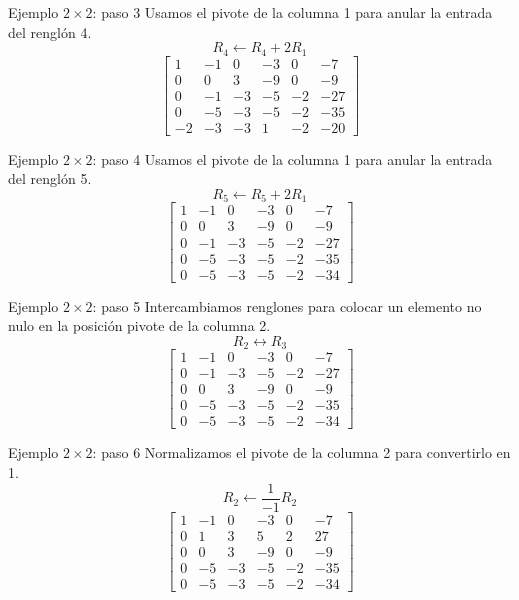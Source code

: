 \documentclass[aspectratio=169,9pt]{beamer}
\theoremstyle{remark}
\begin{document}
\begin{frame}[t]{Ejemplo $2\times2$: paso 3}
Usamos el pivote de la columna 1 para anular la entrada del renglón 4.
\[
R_{4}\leftarrow R_{4}+2R_{1}
\]
\[
\left[\begin{array}{ccccc|c}
1 & -1 & 0 & -3 & 0 & -7\\
0 & 0 & 3 & -9 & 0 & -9\\
0 & -1 & -3 & -5 & -2 & -27\\
0 & -5 & -3 & -5 & -2 & -35\\
-2 & -3 & -3 & 1 & -2 & -20
\end{array}\right]
\]
\end{frame}
\begin{frame}[t]{Ejemplo $2\times2$: paso 4}
Usamos el pivote de la columna 1 para anular la entrada del renglón 5.
\[
R_{5}\leftarrow R_{5}+2R_{1}
\]
\[
\left[\begin{array}{ccccc|c}
1 & -1 & 0 & -3 & 0 & -7\\
0 & 0 & 3 & -9 & 0 & -9\\
0 & -1 & -3 & -5 & -2 & -27\\
0 & -5 & -3 & -5 & -2 & -35\\
0 & -5 & -3 & -5 & -2 & -34
\end{array}\right]
\]
\end{frame}
\begin{frame}[t]{Ejemplo $2\times2$: paso 5}
Intercambiamos renglones para colocar un elemento no nulo en la posición pivote de la columna 2.
\[
R_{2}\leftrightarrow R_{3}
\]
\[
\left[\begin{array}{ccccc|c}
1 & -1 & 0 & -3 & 0 & -7\\
0 & -1 & -3 & -5 & -2 & -27\\
0 & 0 & 3 & -9 & 0 & -9\\
0 & -5 & -3 & -5 & -2 & -35\\
0 & -5 & -3 & -5 & -2 & -34
\end{array}\right]
\]
\end{frame}
\begin{frame}[t]{Ejemplo $2\times2$: paso 6}
Normalizamos el pivote de la columna 2 para convertirlo en 1.
\[
R_{2}\leftarrow \frac{1}{-1}R_{2}
\]
\[
\left[\begin{array}{ccccc|c}
1 & -1 & 0 & -3 & 0 & -7\\
0 & 1 & 3 & 5 & 2 & 27\\
0 & 0 & 3 & -9 & 0 & -9\\
0 & -5 & -3 & -5 & -2 & -35\\
0 & -5 & -3 & -5 & -2 & -34
\end{array}\right]
\]
\end{frame}
\end{document}
